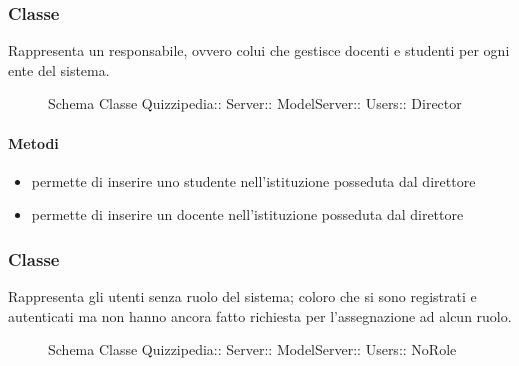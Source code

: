 \subsubsection{Classe }
Rappresenta un responsabile, ovvero colui che gestisce docenti e studenti per ogni ente del sistema.
\begin{figure}[H]
\centering
\noindent{}
\caption[Schema Classe Director]{Schema Classe Quizzipedia:: Server:: ModelServer:: Users:: Director}
\end{figure}
\paragraph{Metodi}
\begin{itemize}
\item {}
\newline
permette di inserire uno studente nell'istituzione posseduta dal direttore
\newline
\item {}
\newline
permette di inserire un docente nell'istituzione posseduta dal direttore
\newline
\end{itemize}
\subsubsection{Classe }
Rappresenta gli utenti senza ruolo del sistema; coloro che si sono registrati e autenticati ma non hanno ancora fatto richiesta per l'assegnazione ad alcun ruolo.
\begin{figure}[H]
\centering
\noindent{}
\caption[Schema Classe NoRole]{Schema Classe Quizzipedia:: Server:: ModelServer:: Users:: NoRole}
\end{figure}
